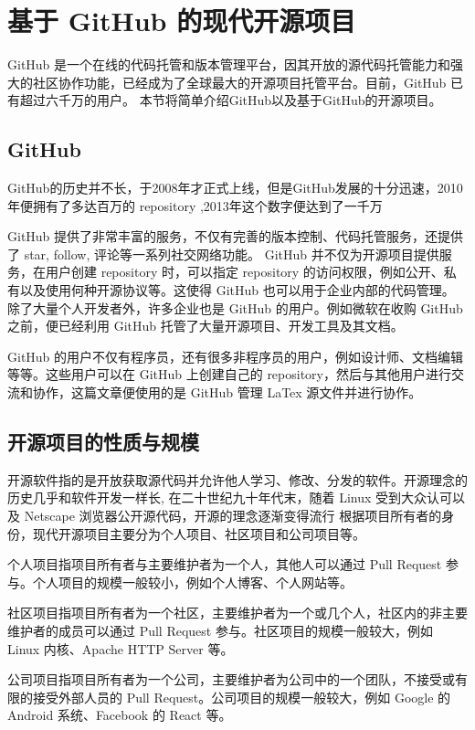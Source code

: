 \documentclass[../main.tex]{subfiles}
\begin{document}
\section{基于 GitHub 的现代开源项目}
GitHub 是一个在线的代码托管和版本管理平台，因其开放的源代码托管能力和强大的社区协作功能，已经成为了全球最大的开源项目托管平台。目前，GitHub 已有超过六千万的用户。
本节将简单介绍GitHub以及基于GitHub的开源项目。
\subsection{GitHub}

GitHub的历史并不长，于2008年才正式上线，但是GitHub发展的十分迅速，2010年便拥有了多达百万的 repository \cite{github_million},2013年这个数字便达到了一千万\cite{github_ten_million}

GitHub 提供了非常丰富的服务，不仅有完善的版本控制、代码托管服务，还提供了 star, follow, 评论等一系列社交网络功能。
GitHub 并不仅为开源项目提供服务，在用户创建 repository 时，可以指定 repository 的访问权限，例如公开、私有以及使用何种开源协议等。这使得 GitHub 也可以用于企业内部的代码管理。
除了大量个人开发者外，许多企业也是 GitHub 的用户。例如微软在收购 GitHub 之前，便已经利用 GitHub 托管了大量开源项目、开发工具及其文档。

GitHub 的用户不仅有程序员，还有很多非程序员的用户，例如设计师、文档编辑等等。这些用户可以在 GitHub 上创建自己的 repository，然后与其他用户进行交流和协作，这篇文章便使用的是 GitHub 管理 LaTex 源文件并进行协作。

\subsection{开源项目的性质与规模}

开源软件指的是开放获取源代码并允许他人学习、修改、分发的软件。开源理念的历史几乎和软件开发一样长,
在二十世纪九十年代末，随着 Linux 受到大众认可以及 Netscape 浏览器公开源代码，开源的理念逐渐变得流行\cite{opensource}
根据项目所有者的身份，现代开源项目主要分为个人项目、社区项目和公司项目等。

个人项目指项目所有者与主要维护者为一个人，其他人可以通过 Pull Request 参与。个人项目的规模一般较小，例如个人博客、个人网站等。

社区项目指项目所有者为一个社区，主要维护者为一个或几个人，社区内的非主要维护者的成员可以通过 Pull Request 参与。社区项目的规模一般较大，例如 Linux 内核、Apache HTTP Server 等。

公司项目指项目所有者为一个公司，主要维护者为公司中的一个团队，不接受或有限的接受外部人员的 Pull Request。公司项目的规模一般较大，例如 Google 的 Android 系统、Facebook 的 React 等。
\end{document}
